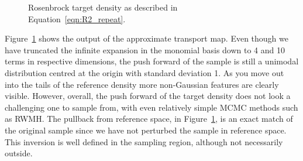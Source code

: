\documentclass[final]{siamltex}
\begin{document}
\begin{figure}[htpb]
\centering
{}\quad
{}\quad
{}
\caption{Rosenbrock target density as described in Equation~\eqref{eqn:R2_repeat}.}
\label{fig:R2_transport}
\end{figure}

Figure~\ref{fig:R2_transport} shows the output of the approximate
transport map. Even though we have truncated the infinite expansion in
the monomial basis down to 4 and 10 terms in respective dimensions,
the push forward of the sample is still a unimodal distribution
centred at the origin with standard deviation 1. As you move out into
the tails of the reference density more non-Gaussian features are
clearly visible. However, overall, the push forward of the target
density does not look a challenging one to sample from, with even
relatively simple MCMC methods such as RWMH. The pullback from
reference space, in Figure~\ref{fig:R2_transport}, is an exact match
of the original sample since we have not perturbed the sample in
reference space. This inversion is well defined in the sampling
region, although not necessarily outside\cite{parno2014transport}.
\end{document}
